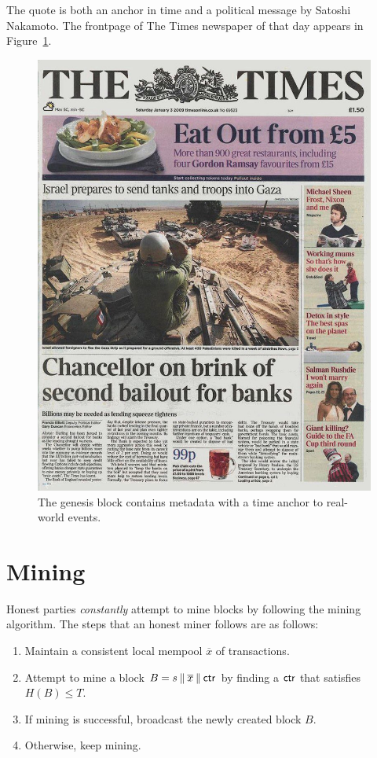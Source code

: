 The quote is both an anchor in time and a political message by Satoshi Nakamoto. The
frontpage of The Times newspaper of that day appears in Figure~\ref{fig.thetimes}.

\begin{figure}[h]
    \centering
    \includegraphics[width=1 \columnwidth,keepaspectratio]{figures/thetimes.jpg}
    \caption{The genesis block contains metadata with a time anchor to real-world events.}
    \label{fig.thetimes}
\end{figure}

\section{Mining}

Honest parties \emph{constantly} attempt to mine blocks by following the mining algorithm.
The steps that an honest miner follows are as follows:

\begin{enumerate}
  \item Maintain a consistent local mempool $\overline{x}$ of transactions.
  \item Attempt to mine a block $B = s \mathbin{\|} \overline{x} \mathbin{\|} \mathsf{ctr}$ by finding a $\mathsf{ctr}$ that satisfies $H(B) \leq T$.
  \item If mining is successful, broadcast the newly created block $B$.
  \item Otherwise, keep mining.
\end{enumerate}

